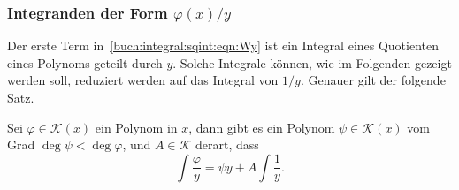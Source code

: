 %
%
\subsubsection{Integranden der Form $\varphi(x)/y$}
Der erste Term in~\eqref{buch:integral:sqint:eqn:Wy} ist ein Integral eines
Quotienten eines Polynoms geteilt durch $y$.
Solche Integrale können, wie im Folgenden gezeigt werden soll, reduziert
werden auf das Integral von $1/y$.
Genauer gilt der folgende Satz.

\begin{satz}
\label{buch:integral:sqint:satz:polyy}
Sei $\varphi\in\mathcal{K}(x)$ ein Polynom in $x$, dann gibt
es ein Polynom $\psi\in\mathcal{K}(x)$ vom Grad $\deg\psi < \deg\varphi$,
und $A\in\mathcal{K}$ derart, dass
\begin{equation}
\int \frac{\varphi}{y}
=
\psi y + A\int\frac{1}{y}.
\label{buch:integral:sqint:eqn:phipsi}
\end{equation}
\end{satz}

